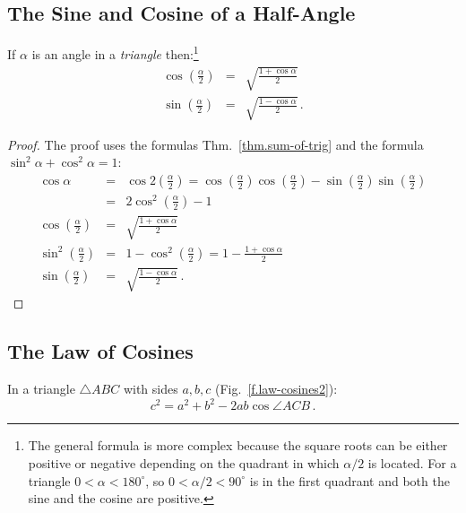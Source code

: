 \subsection{The Sine and Cosine of a Half-Angle}\label{s.sine-cosine-half}
\begin{theorem}\label{thm.sine-cosine-half}
If $\alpha$ is an angle in a \emph{triangle} then:\footnote{The general formula is more complex  because the square roots can be either positive or negative depending on the quadrant in which $\alpha/2$ is located. For a triangle $0\!<\!\alpha\!<\!180^\circ$, so $0\!<\!\alpha/2\!<\!90^\circ$ is in the first quadrant and both the sine and the cosine are positive.}
\begin{eqnarray*}
\cos \left(\frac{\alpha}{2}\right)&=&\sqrt{\frac{1+\cos\alpha}{2}}\\
\sin\left(\frac{\alpha}{2}\right)&=&\sqrt{\frac{1-\cos\alpha}{2}}\,.
\end{eqnarray*}
\end{theorem}

\begin{proof}
The proof uses the formulas Thm.~\ref{thm.sum-of-trig} and the formula $\sin^2\alpha+\cos^2\alpha=1$:
\begin{eqnarray*}
\cos \alpha&=&\cos 2\left(\frac{\alpha}{2}\right)=\cos \left(\frac{\alpha}{2}\right)\cos\left(\frac{\alpha}{2}\right)-\sin \left(\frac{\alpha}{2}\right)\sin\left(\frac{\alpha}{2}\right)\\
&=&2\cos^2 \left(\frac{\alpha}{2}\right)-1\\
\cos \left(\frac{\alpha}{2}\right)&=&\sqrt{\frac{1+\cos\alpha}{2}}\\
\sin^2\left(\frac{\alpha}{2}\right)&=& 1-\cos^2\left(\frac{\alpha}{2}\right)=1-\frac{1+\cos\alpha}{2}\\
\sin \left(\frac{\alpha}{2}\right)&=&\sqrt{\frac{1-\cos\alpha}{2}}\,.
\end{eqnarray*}
\end{proof}


\subsection{The Law of Cosines}

\begin{theorem}
In  a triangle $\triangle ABC$ with sides $a,b,c$ (Fig.~\ref{f.law-cosines2}):\label{thm.law-of-cosines}
\[
c^2=a^2+b^2-2ab\cos \angle ACB\,.
\]
\end{theorem}


